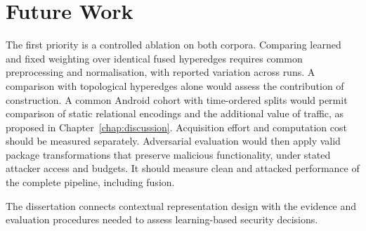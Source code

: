 \section{Future Work}
\label{sec:conclusion:3}

The first priority is a controlled \hgann{} ablation on both corpora. Comparing learned and
fixed weighting over identical fused hyperedges requires common preprocessing and
normalisation, with reported variation across runs. A comparison with topological
hyperedges alone would assess the contribution of construction.
A common Android cohort with time-ordered splits would permit comparison of static relational
encodings and the additional value of traffic, as proposed in Chapter~\ref{chap:discussion}.
Acquisition effort and computation cost should be measured separately. Adversarial evaluation
would then apply valid package transformations that preserve malicious functionality, under
stated attacker access and budgets. It should measure clean and attacked performance of the
complete pipeline, including fusion.

The dissertation connects contextual representation design with the evidence and evaluation
procedures needed to assess learning-based security decisions.

